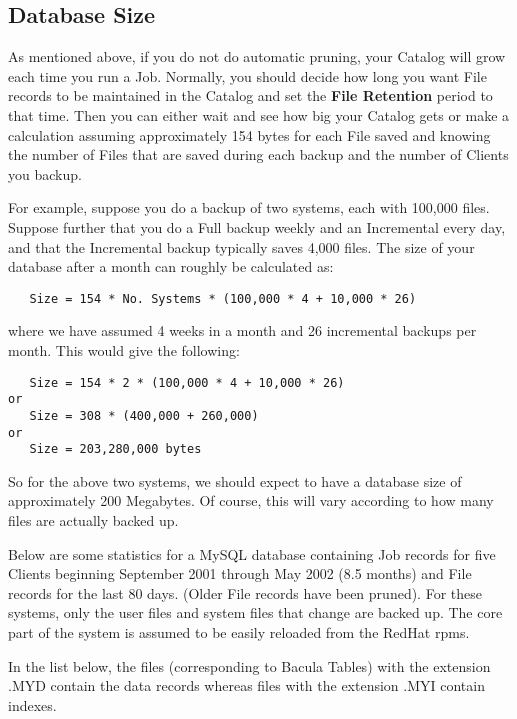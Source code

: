 \subsection*{Database Size}

As mentioned above, if you do not do automatic pruning, your Catalog will grow
each time you run a Job. Normally, you should decide how long you want File
records to be maintained in the Catalog and set the {\bf File Retention}
period to that time. Then you can either wait and see how big your Catalog
gets or make a calculation assuming approximately 154 bytes for each File
saved and knowing the number of Files that are saved during each backup and
the number of Clients you backup. 

For example, suppose you do a backup of two systems, each with 100,000 files.
Suppose further that you do a Full backup weekly and an Incremental every day,
and that the Incremental backup typically saves 4,000 files. The size of your
database after a month can roughly be calculated as: 

\footnotesize
\begin{verbatim}
   Size = 154 * No. Systems * (100,000 * 4 + 10,000 * 26)
\end{verbatim}
\normalsize

where we have assumed 4 weeks in a month and 26 incremental backups per month.
This would give the following: 

\footnotesize
\begin{verbatim}
   Size = 154 * 2 * (100,000 * 4 + 10,000 * 26)
or
   Size = 308 * (400,000 + 260,000)
or
   Size = 203,280,000 bytes
\end{verbatim}
\normalsize

So for the above two systems, we should expect to have a database size of
approximately 200 Megabytes. Of course, this will vary according to how many
files are actually backed up. 

Below are some statistics for a MySQL database containing Job records for five
Clients beginning September 2001 through May 2002 (8.5 months) and File
records for the last 80 days. (Older File records have been pruned). For these
systems, only the user files and system files that change are backed up. The
core part of the system is assumed to be easily reloaded from the RedHat rpms.


In the list below, the files (corresponding to Bacula Tables) with the
extension .MYD contain the data records whereas files with the extension .MYI
contain indexes. 

